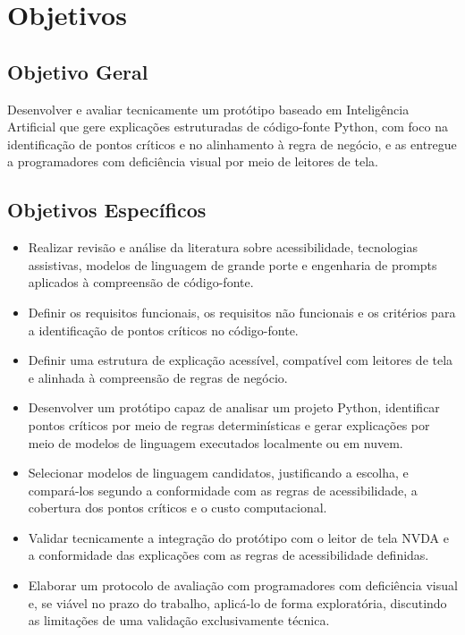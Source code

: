 \documentclass[
    12pt,                   %
    openright,              %
    oneside,                %
    a4paper,                %
    sumario=tradicional,    %
    english,                %
    brazil,                 %
    ]{abntex2}
\begin{document}
\section{Objetivos}\label{sec:objetivos}

\subsection{Objetivo Geral}

Desenvolver e avaliar tecnicamente um protótipo baseado em Inteligência Artificial que gere explicações estruturadas de código-fonte Python, com foco na identificação de pontos críticos e no alinhamento à regra de negócio, e as entregue a programadores com deficiência visual por meio de leitores de tela.

\subsection{Objetivos Específicos}

\begin{itemize}
  \item Realizar revisão e análise da literatura sobre acessibilidade, tecnologias assistivas, modelos de linguagem de grande porte e engenharia de prompts aplicados à compreensão de código-fonte.
  \item Definir os requisitos funcionais, os requisitos não funcionais e os critérios para a identificação de pontos críticos no código-fonte.
  \item Definir uma estrutura de explicação acessível, compatível com leitores de tela e alinhada à compreensão de regras de negócio.
  \item Desenvolver um protótipo capaz de analisar um projeto Python, identificar pontos críticos por meio de regras determinísticas e gerar explicações por meio de modelos de linguagem executados localmente ou em nuvem.
  \item Selecionar modelos de linguagem candidatos, justificando a escolha, e compará-los segundo a conformidade com as regras de acessibilidade, a cobertura dos pontos críticos e o custo computacional.
  \item Validar tecnicamente a integração do protótipo com o leitor de tela NVDA e a conformidade das explicações com as regras de acessibilidade definidas.
  \item Elaborar um protocolo de avaliação com programadores com deficiência visual e, se viável no prazo do trabalho, aplicá-lo de forma exploratória, discutindo as limitações de uma validação exclusivamente técnica.
\end{itemize}
\end{document}
